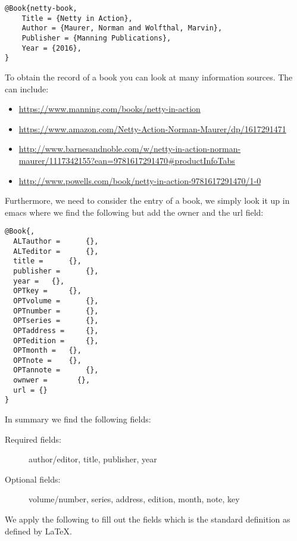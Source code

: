 \begin{verbatim}
@Book{netty-book,
    Title = {Netty in Action},
    Author = {Maurer, Norman and Wolfthal, Marvin},
    Publisher = {Manning Publications},
    Year = {2016},
}
\end{verbatim}

To obtain the record of a book you can look at many information sources.
The can include:

\begin{itemize}

\item
  \url{https://www.manning.com/books/netty-in-action}
\item
  \url{https://www.amazon.com/Netty-Action-Norman-Maurer/dp/1617291471}
\item
  \url{http://www.barnesandnoble.com/w/netty-in-action-norman-maurer/1117342155?ean=9781617291470\#productInfoTabs}
\item
  \url{http://www.powells.com/book/netty-in-action-9781617291470/1-0}
\end{itemize}

Furthermore, we need to consider the entry of a book, we simply look it
up in emacs where we find the following but add the owner and the url
field:

\begin{verbatim}
@Book{,
  ALTauthor =      {},
  ALTeditor =      {},
  title =      {},
  publisher =      {},
  year =   {},
  OPTkey =     {},
  OPTvolume =      {},
  OPTnumber =      {},
  OPTseries =      {},
  OPTaddress =     {},
  OPTedition =     {},
  OPTmonth =   {},
  OPTnote =    {},
  OPTannote =      {},
  ownwer =       {},
  url = {}
}
\end{verbatim}

In summary we find the following fields:

\begin{description}
\item[Required fields:]
author/editor, title, publisher, year
\item[Optional fields:]
volume/number, series, address, edition, month, note, key
\end{description}

We apply the following to fill out the fields which is the standard
definition as defined by \LaTeX.

